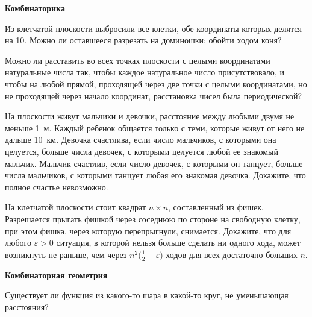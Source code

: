 \documentclass[a4paper,12pt]{article}
\begin{document}

\begin{center}
{\bf Комбинаторика}
\end{center}

 Из клетчатой плоскости выбросили все клетки, обе
координаты которых делятся на 10. Можно ли оставшееся  разрезать на доминошки;  обойти ходом коня?

 Можно ли расставить во всех точках плоскости с целыми координатами
натуральные числа так, чтобы каждое натуральное число присутствовало, %
и чтобы на любой прямой, проходящей через две точки с целыми координатами,
но не проходящей через начало координат, расстановка чисел была периодической?

 На плоскости живут мальчики и девочки, расстояние между любыми двумя
не меньше 1~м. Каждый ребенок общается только с теми, которые живут от
него не дальше 10~км. Девочка счастлива, если число мальчиков, с которыми
она целуется, больше числа девочек, с которыми целуется любой ее знакомый
мальчик.  Мальчик счастлив, если число девочек, с которыми
он танцует, больше числа мальчиков, с которыми танцует
любая его знакомая девочка. Докажите, что полное счастье невозможно.

 На клетчатой плоскости стоит квадрат $n\times n$, составленный из
фишек.  Разрешается прыгать фишкой через соседнюю по стороне на свободную
клетку, при этом фишка, через которую перепрыгнули, снимается. Докажите,
что для любого $\varepsilon>0$ ситуация, в которой нельзя больше сделать ни
одного хода, может возникнуть не раньше, чем через
$n^2\bigl(\frac12-\varepsilon\bigr)$ ходов для всех достаточно больших $n$.

\begin{center}
{\bf Комбинаторная геометрия}
\end{center}


 Существует ли функция из какого-то шара в какой-то круг, не
уменьшающая расстояния?

\end{document}

